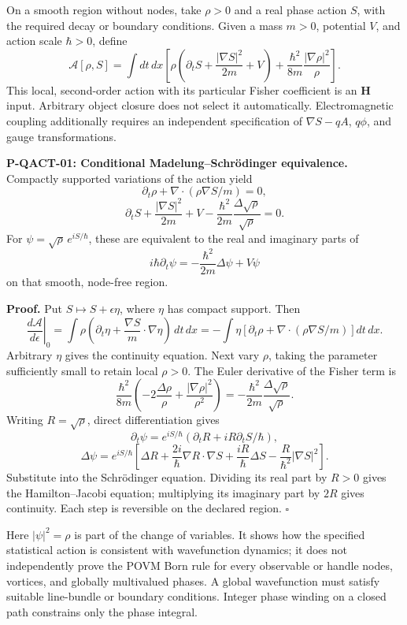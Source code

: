 \documentclass[
  11pt,
  oneside]{book}
\begin{document}
On a smooth region without nodes, take \(\rho>0\) and a real phase
action \(S\), with the required decay or boundary conditions. Given a
mass \(m>0\), potential \(V\), and action scale \(\hbar>0\), define \[
\mathcal A[\rho,S]=\int dt\,dx\left[
\rho\left(\partial_tS+\frac{|\nabla S|^2}{2m}+V\right)
+\frac{\hbar^2}{8m}\frac{|\nabla\rho|^2}{\rho}\right].
\] This local, second-order action with its particular Fisher
coefficient is an \textbf{H} input. Arbitrary object closure does not
select it automatically. Electromagnetic coupling additionally requires
an independent specification of \(\nabla S-qA\), \(q\phi\), and gauge
transformations.

\label{p-qact-01}{}

\textbf{P-QACT-01: Conditional Madelung--Schrödinger equivalence.}
Compactly supported variations of the action yield \[
\partial_t\rho+\nabla\cdot(\rho\nabla S/m)=0,
\] \[
\partial_tS+\frac{|\nabla S|^2}{2m}+V
-\frac{\hbar^2}{2m}\frac{\Delta\sqrt\rho}{\sqrt\rho}=0.
\] For \(\psi=\sqrt\rho\,e^{iS/\hbar}\), these are equivalent to the
real and imaginary parts of \[
i\hbar\partial_t\psi=
-\frac{\hbar^2}{2m}\Delta\psi+V\psi
\] on that smooth, node-free region.

\textbf{Proof.} Put \(S\mapsto S+\epsilon\eta\), where \(\eta\) has
compact support. Then \[
\left.\frac{d\mathcal A}{d\epsilon}\right|_0
=\int\rho\left(\partial_t\eta+\frac{\nabla S}{m}\cdot\nabla\eta\right)\,dt\,dx
=-\int\eta\left[\partial_t\rho+\nabla\cdot(\rho\nabla S/m)\right]dt\,dx.
\] Arbitrary \(\eta\) gives the continuity equation. Next vary \(\rho\),
taking the parameter sufficiently small to retain local \(\rho>0\). The
Euler derivative of the Fisher term is \[
\frac{\hbar^2}{8m}
\left(-2\frac{\Delta\rho}{\rho}
+\frac{|\nabla\rho|^2}{\rho^2}\right)
=-\frac{\hbar^2}{2m}\frac{\Delta\sqrt\rho}{\sqrt\rho}.
\] Writing \(R=\sqrt\rho\), direct differentiation gives \[
\partial_t\psi=e^{iS/\hbar}(\partial_tR+iR\partial_tS/\hbar),
\] \[
\Delta\psi=e^{iS/\hbar}\left[\Delta R+
\frac{2i}{\hbar}\nabla R\cdot\nabla S+
\frac{iR}{\hbar}\Delta S-\frac{R}{\hbar^2}|\nabla S|^2\right].
\] Substitute into the Schrödinger equation. Dividing its real part by
\(R>0\) gives the Hamilton--Jacobi equation; multiplying its imaginary
part by \(2R\) gives continuity. Each step is reversible on the declared
region. \(\square\)

Here \(|\psi|^2=\rho\) is part of the change of variables. It shows how
the specified statistical action is consistent with wavefunction
dynamics; it does not independently prove the POVM Born rule for every
observable or handle nodes, vortices, and globally multivalued phases. A
global wavefunction must satisfy suitable line-bundle or boundary
conditions. Integer phase winding on a closed path constrains only the
phase integral.
\end{document}
